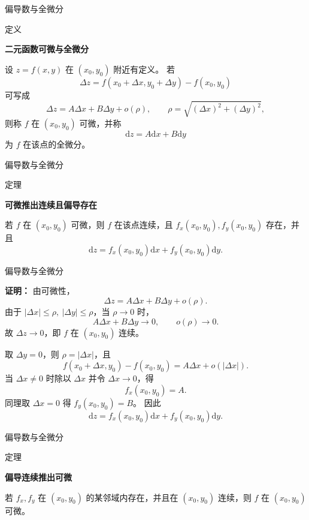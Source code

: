 \documentclass[aspectratio=169,10pt,fontset=fandol]{ctexbeamer}
\newcommand{\dd}{\mathrm{d}}
\begin{document}
\begin{frame}[t,fragile]{偏导数与全微分}
\footnotesize
\begin{block}{定义}
{\footnotesize
\textbf{二元函数可微与全微分}\par

设 $z=f(x,y)$ 在 $(x_0,y_0)$ 附近有定义。 若
\[
\Delta z=f(x_0+\Delta x,y_0+\Delta y)-f(x_0,y_0)
\]
可写成
\[
\Delta z=A\Delta x+B\Delta y+o(\rho),
\qquad \rho=\sqrt{(\Delta x)^2+(\Delta y)^2},
\]
则称 $f$ 在 $(x_0,y_0)$ 可微，并称
\[
\dd z=A\dd x+B\dd y
\]
为 $f$ 在该点的全微分。

}
\end{block}
\end{frame}
\begin{frame}[t,fragile]{偏导数与全微分}
\footnotesize
\begin{block}{定理}
{\footnotesize
\textbf{可微推出连续且偏导存在}\par

若 $f$ 在 $(x_0,y_0)$ 可微，则 $f$ 在该点连续，且 $f_x(x_0,y_0),f_y(x_0,y_0)$ 存在，并且
\[
\dd z=f_x(x_0,y_0)\dd x+f_y(x_0,y_0)\dd y.
\]

}
\end{block}
\end{frame}
\begin{frame}[t,fragile]{偏导数与全微分}
\footnotesize
{\footnotesize
\textbf{证明：}
由可微性，
\[
\Delta z=A\Delta x+B\Delta y+o(\rho).
\]
由于 $|\Delta x|\leq\rho,\ |\Delta y|\leq\rho$，当 $\rho\to0$ 时，
\[
A\Delta x+B\Delta y\to0,\qquad o(\rho)\to0.
\]
故 $\Delta z\to0$，即 $f$ 在 $(x_0,y_0)$ 连续。

取 $\Delta y=0$，则 $\rho=|\Delta x|$，且
\[
f(x_0+\Delta x,y_0)-f(x_0,y_0)=A\Delta x+o(|\Delta x|).
\]
当 $\Delta x\neq0$ 时除以 $\Delta x$ 并令 $\Delta x\to0$，得
\[
f_x(x_0,y_0)=A.
\]
同理取 $\Delta x=0$ 得 $f_y(x_0,y_0)=B$。 因此
\[
\dd z=f_x(x_0,y_0)\dd x+f_y(x_0,y_0)\dd y.
\]

}
\end{frame}
\begin{frame}[t,fragile]{偏导数与全微分}
\footnotesize
\begin{block}{定理}
{\footnotesize
\textbf{偏导连续推出可微}\par

若 $f_x,f_y$ 在 $(x_0,y_0)$ 的某邻域内存在，并且在 $(x_0,y_0)$ 连续，则 $f$ 在 $(x_0,y_0)$ 可微。

}
\end{block}
\end{frame}
\end{document}
